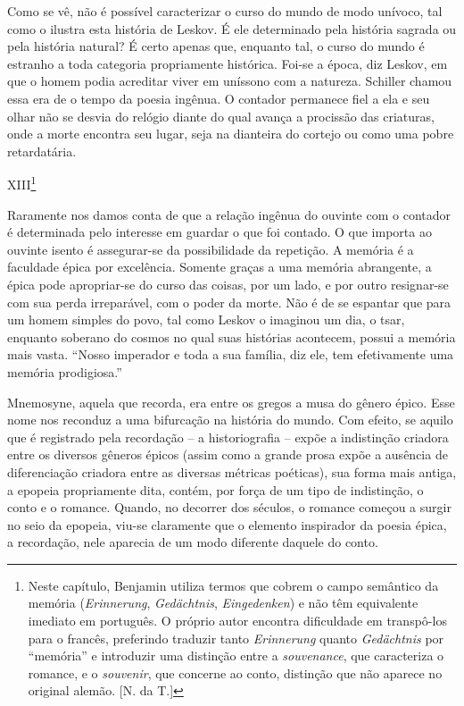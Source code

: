 Como se vê, não é possível caracterizar o curso do mundo de modo
unívoco, tal como o ilustra esta história de Leskov. É ele determinado
pela história sagrada ou pela história natural? É certo apenas que,
enquanto tal, o curso do mundo é estranho a toda categoria propriamente
histórica. Foi-se a época, diz Leskov, em que o homem podia acreditar
viver em uníssono com a natureza. Schiller chamou essa era de o tempo da
poesia ingênua. O contador permanece fiel a ela e seu olhar não se
desvia do relógio diante do qual avança a procissão das criaturas, onde
a morte encontra seu lugar, seja na dianteira do cortejo ou como uma
pobre retardatária.

XIII\footnote{Neste capítulo, Benjamin utiliza termos que cobrem o campo
  semântico da memória (\emph{Erinnerung}, \emph{Gedächtnis},
  \emph{Eingedenken}) e não têm equivalente imediato em português. O
  próprio autor encontra dificuldade em transpô-los para o francês,
  preferindo traduzir tanto \emph{Erinnerung} quanto \emph{Gedächtnis}
  por ``memória'' e introduzir uma distinção entre a \emph{souvenance},
  que caracteriza o romance, e o \emph{souvenir}, que concerne ao conto,
  distinção que não aparece no original alemão. {[}N. da T.{]}}

Raramente nos damos conta de que a relação ingênua do ouvinte com o
contador é determinada pelo interesse em guardar o que foi contado. O
que importa ao ouvinte isento é assegurar-se da possibilidade da
repetição. A memória é a faculdade épica por excelência. Somente graças
a uma memória abrangente, a épica pode apropriar-se do curso das coisas,
por um lado, e por outro resignar-se com sua perda irreparável, com o
poder da morte. Não é de se espantar que para um homem simples do povo,
tal como Leskov o imaginou um dia, o tsar, enquanto soberano do cosmos
no qual suas histórias acontecem, possui a memória mais vasta. ``Nosso
imperador e toda a sua família, diz ele, tem efetivamente uma memória
prodigiosa.''

Mnemosyne, aquela que recorda, era entre os gregos a musa do gênero
épico. Esse nome nos reconduz a uma bifurcação na história do mundo. Com
efeito, se aquilo que é registrado pela recordação -- a historiografia
-- expõe a indistinção criadora entre os diversos gêneros épicos (assim
como a grande prosa expõe a ausência de diferenciação criadora entre as
diversas métricas poéticas), sua forma mais antiga, a epopeia
propriamente dita, contém, por força de um tipo de indistinção, o conto
e o romance. Quando, no decorrer dos séculos, o romance começou a surgir
no seio da epopeia, viu-se claramente que o elemento inspirador da
poesia épica, a recordação, nele aparecia de um modo diferente daquele
do conto.

